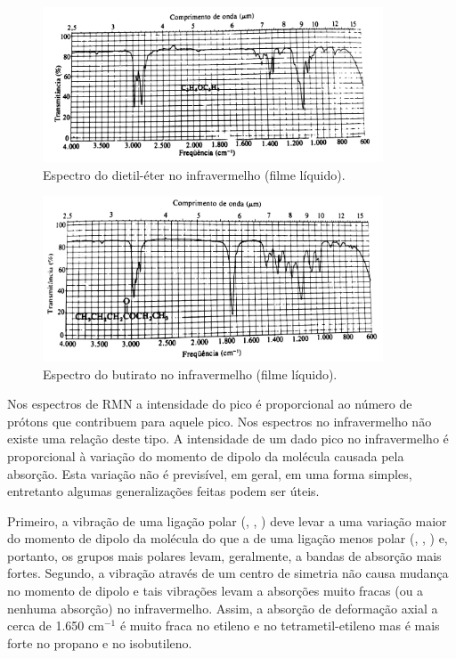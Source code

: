 \begin{figure}[H]
    \centering
    \includegraphics[width=0.9\textwidth,angle=0]{content/images/Figura_9_6.pdf}
    \caption{Espectro do dietil-éter no infravermelho (filme líquido).}
    \label{figura_9_6}
\end{figure}

\begin{figure}[H]
    \centering
    \includegraphics[width=0.9\textwidth,angle=0]{content/images/Figura_9_7.pdf}
    \caption{Espectro do butirato no infravermelho (filme líquido).}
    \label{figura_9_7}
\end{figure}

Nos espectros de RMN a intensidade do pico é proporcional ao número de prótons que contribuem para aquele pico. Nos espectros no infravermelho não existe uma relação deste tipo. A intensidade de um dado pico no infravermelho é proporcional à variação do momento de dipolo da molécula causada pela absorção. Esta variação não é previsível, em geral, em uma forma simples, entretanto algumas generalizações feitas podem ser úteis.

Primeiro, a vibração de uma ligação polar (, , ) deve levar a uma variação maior do momento de dipolo da molécula do que a de uma ligação menos polar (, , ) e, portanto, os grupos mais polares levam, geralmente, a bandas de absorção mais fortes. Segundo, a vibração através de um centro de simetria não causa mudança no momento de dipolo e tais vibrações levam a absorções muito fracas (ou a nenhuma absorção) no infravermelho. Assim, a absorção de deformação axial a cerca de 1.650 cm$^{-1}$ é muito fraca no etileno e no tetrametil-etileno mas é mais forte no propano e no isobutileno.

